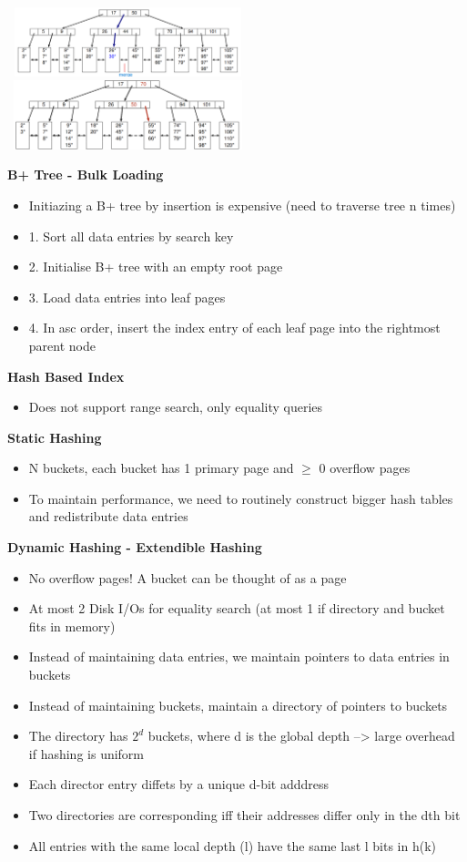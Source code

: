 \documentclass[10pt, landscape]{article}
\begin{document}
\begin{multicols}{4}
\includegraphics[width=7cm, height=2cm]{merge_nodes.png}
\includegraphics[width=7cm, height=2cm]{merge_parent.png}

\textbf{B+ Tree - Bulk Loading}
\begin{itemize}
  \item Initiazing a B+ tree by insertion is expensive (need to traverse tree n times)
  \item 1. Sort all data entries by search key
  \item 2. Initialise B+ tree with an empty root page
  \item 3. Load data entries into leaf pages 
  \item 4. In asc order, insert the index entry of each leaf page into the rightmost parent node
\end{itemize}


\textbf{Hash Based Index}
\begin{itemize}
  \item Does not support range search, only equality queries
\end{itemize}

\textbf{Static Hashing}
\begin{itemize}
  \item N buckets, each bucket has 1 primary page and $\geq$ 0 overflow pages
  \item To maintain performance, we need to routinely construct bigger hash tables and redistribute data entries
\end{itemize}

\textbf{Dynamic Hashing - Extendible Hashing}
\begin{itemize}
  \item No overflow pages! A bucket can be thought of as a page
  \item At most 2 Disk I/Os for equality search (at most 1 if directory and bucket fits in memory)
  \item Instead of maintaining data entries, we maintain pointers to data entries in buckets
  \item Instead of maintaining buckets, maintain a directory of pointers to buckets
  \item The directory has $2^d$ buckets, where d is the global depth --> large overhead if hashing is uniform
  \item Each director entry diffets by a unique d-bit adddress
  \item Two directories are corresponding iff their addresses differ only in the dth bit
  \item All entries with the same local depth (l) have the same last l bits in h(k)
\end{itemize}


\end{multicols}
\end{document}
